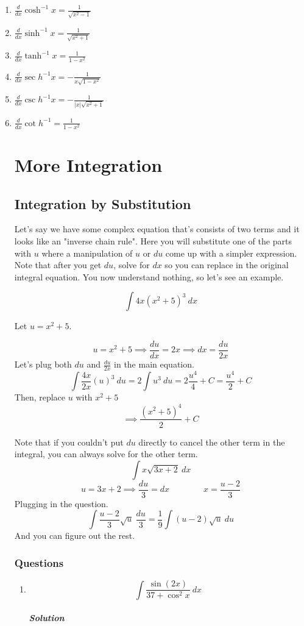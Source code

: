 \documentclass{article}
\begin{document}
\begin{enumerate}[1.]

		\item $ \frac{d}{dx} \cosh^{-1}x = \frac{1}{\sqrt{x^2-1}}$ 
		\item $ \frac{d}{dx} \sinh^{-1}x = \frac{1}{ \sqrt{ x^2+1 } } $ 
		\item $ \frac{d}{dx} \tanh^{-1}x = \frac{1}{1-x^2} $ 
		\item $ \frac{d}{dx} \sec h^{-1}x = -\frac{1}{x \sqrt{ 1-x^2 }} $
		\item $ \frac{d}{dx} \csc h^{-1}x = -\frac{1}{|x| \sqrt{ x^2+1 }} $
		\item $ \frac{d}{dx} \cot h^{-1} = \frac{1}{1-x^2}$

\newpage

\section{More Integration}

\subsection{Integration by Substitution}

Let's say we have some complex equation that's consists of two terms and it looks like an "inverse chain rule". Here you will substitute one of the parts with $ u $ where a manipulation of $ u $ or $ du $ come up with a simpler expression. Note that after you get $ du $, solve for $ dx $ so you can replace in the original integral equation. You now understand nothing, so let's see an example.

\[
	\int 4x (x^2+5)^3 \ dx 
\]

Let $u=x^2+5$.

\[
	u = x^2+5 \implies \frac{du}{dx} = 2x \implies dx = \frac{du}{2x}
\]
Let's plug both $du$ and $ \frac{du}{2x} $ in the main equation.
\[
	\int \frac{4x}{2x} (u)^3 \ du = 2\int u^3\ du = 2 \frac{u^4}{4} + C = \frac{u^4}{2} + C
\]
Then, replace $u$ with $x^2+5$
\[
	\implies \frac{ (x^2+5)^4 }{ 2 }  + C
\]

Note that if you couldn't put $du$ directly to cancel the other term in the integral, you can always solve for the other term.
\[
	\int x \sqrt{ 3x+2 }\ dx 
\]
\[
	u = 3x + 2 \implies \frac{du}{3} = dx \qquad \qquad x = \frac{u-2}{3}
\]
Plugging in the  question.
\[
	\int \frac{ u-2 }{ 3 } \sqrt{ u }\ \frac{du}{3} = \frac{1}{9} \int (u-2) \sqrt{ u }\ du 
\]
And you can figure out the rest.

\newpage
\subsubsection{Questions}
\begin{enumerate}[1.]
	\item \[	\int \frac{ \sin(2x) }{ 37 + \cos^2{x}}\ dx  \]
\subparagraph{Solution}


\end{enumerate}
\end{enumerate}
\end{document}
